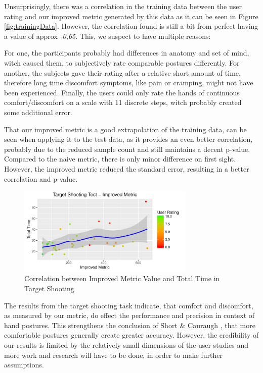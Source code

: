\documentclass{sig-alternate-05-2015}
\begin{document}
Unsurprisingly, there was a correlation in the training data between the user rating and our improved metric generated by this data as it can be seen in Figure \ref{fig:trainingData}. However, the correlation found is still a bit from perfect having a value of approx \textsl{-0,65}. This, we  suspect  to have  multiple  reasons: 

For one, the participants probably had differences in anatomy and set of mind, witch caused them, to subjectively rate comparable postures differently. For another, the subjects gave their rating after a relative short amount of time, therefore long time discomfort symptoms, like pain or cramping, might not have been experienced. Finally, the users could only rate the hands of continuous comfort/discomfort on a scale with 11 discrete steps, witch probably created some additional error.

That our improved metric is a good extrapolation of the training data, can be seen when applying it to the test data, as it provides an even better correlation, probably due to the reduced sample count and still maintains a decent p-value. Compared to the naive metric, there is only minor difference on first sight. However, the improved metric reduced the standard error, resulting in a better correlation and p-value.

\begin{figure}[h]
\centering
\includegraphics[width=8.45cm]{TargetShooting}
\vspace{-20pt}
\caption{Correlation between Improved Metric Value and Total Time in Target Shooting}
\label{fig:targetShooting}
\vspace{-10pt}
\end{figure}

The results from the target shooting task indicate, that comfort and discomfort, as measured by our metric, do effect the performance and precision in context of hand postures. This strengthens the conclusion of Short \& Cauraugh \cite{short1999precision}, that more comfortable postures generally create greater accuracy. However, the credibility of our results is limited by the relatively small dimensions of the user studies and more work and research will have to be done, in order to make further assumptions.
\end{document}
